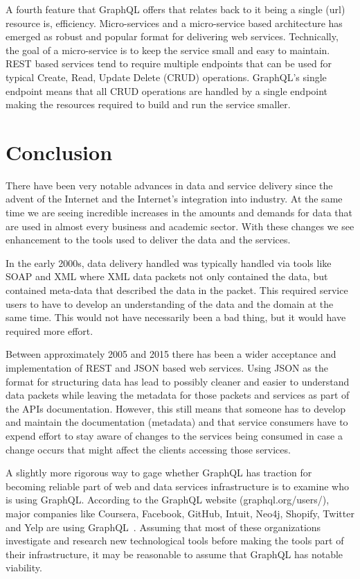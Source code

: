 A fourth feature that GraphQL offers that relates back to it being a single 
(url) resource is, efficiency.  Micro-services and a micro-service based 
architecture has emerged as robust and popular format for delivering web 
services.  Technically, the goal of a micro-service is to keep the service small 
and easy to maintain. REST based services tend to require multiple endpoints 
that can be used for typical Create, Read, Update Delete (CRUD) operations.  
GraphQL's single endpoint means that all CRUD operations are handled by a single 
endpoint making the resources required to build and run the service smaller.

\section{Conclusion}
There have been very notable advances in data and service delivery since the 
advent of the Internet and the Internet's integration into industry.  At the 
same time we are seeing incredible increases in the amounts and demands for 
data that are used in almost every business and academic sector.  With these 
changes we see enhancement to the tools used to deliver the data and the 
services.  

In the early 2000s, data delivery handled was typically handled via tools like 
SOAP and XML where XML data packets not only contained the data, but contained 
meta-data that described the data in the packet.  This required service users 
to have to develop an understanding of the data and the domain at the same 
time.  This would not have necessarily been a bad thing, but it would have 
required more effort.

Between approximately 2005 and 2015 there has been a wider acceptance and 
implementation of REST and JSON based web services.  Using JSON as the format 
for structuring data has lead to possibly cleaner and easier to understand 
data packets while leaving the metadata for those packets and services as part 
of the APIs documentation.  However, this still means that someone has to 
develop and maintain the documentation (metadata) and that service consumers 
have to expend effort to stay aware of changes to the services being consumed 
in case a change occurs that might affect the clients accessing those services.

A slightly more rigorous way to gage whether GraphQL has traction for becoming 
reliable part of web and data services infrastructure is to examine who is 
using GraphQL.  According to the GraphQL website (graphql.org/users/), major 
companies like Coursera, Facebook, GitHub, Intuit, Neo4j, Shopify, Twitter 
and Yelp are using GraphQL~\cite{hid505GraphQLUsers2018}.  Assuming that most of 
these organizations investigate and research new technological tools before 
making the tools part of their infrastructure, it may be reasonable to assume 
that GraphQL has notable viability.

